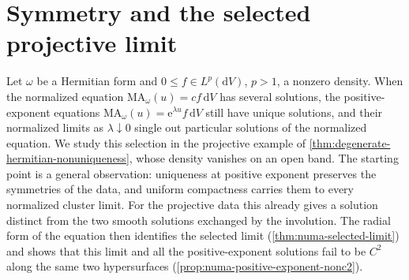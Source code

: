 \section{Symmetry and the selected projective limit}
\label{sec:symmetric-equation-selection}

Let $\omega$ be a Hermitian form and $0\leq f\in L^p(\mathrm{d}V)$, $p>1$, a nonzero density. When the normalized equation $\mathrm{MA}_\omega(u)=cf\,\mathrm{d}V$ has several solutions, the positive-exponent equations $\mathrm{MA}_\omega(u)=\mathrm{e}^{\lambda u}f\,\mathrm{d}V$ still have unique solutions, and their normalized limits as $\lambda\downarrow0$ single out particular solutions of the normalized equation. We study this selection in the projective example of \cref{thm:degenerate-hermitian-nonuniqueness}, whose density vanishes on an open band. The starting point is a general observation: uniqueness at positive exponent preserves the symmetries of the data, and uniform compactness carries them to every normalized cluster limit. For the projective data this already gives a solution distinct from the two smooth solutions exchanged by the involution. The radial form of the equation then identifies the selected limit (\cref{thm:numa-selected-limit}) and shows that this limit and all the positive-exponent solutions fail to be $C^2$ along the same two hypersurfaces (\cref{prop:numa-positive-exponent-nonc2}).

